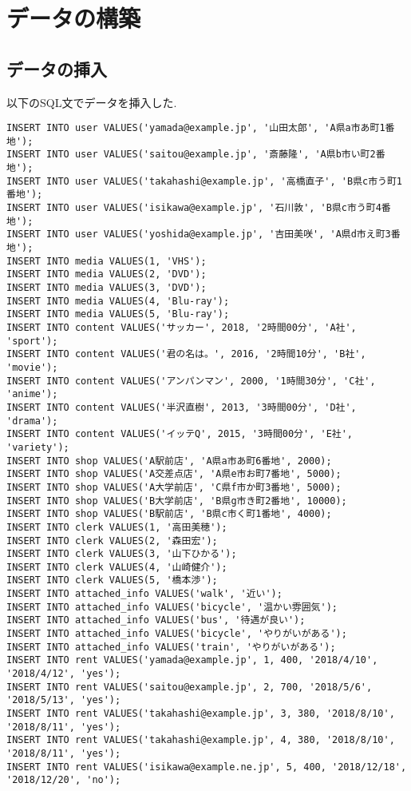 \documentclass{jarticle}
\begin{document}
\section{データの構築}
\subsection{データの挿入}
以下のSQL文でデータを挿入した.
\begin{verbatim}
INSERT INTO user VALUES('yamada@example.jp', '山田太郎', 'A県a市あ町1番地');
INSERT INTO user VALUES('saitou@example.jp', '斎藤隆', 'A県b市い町2番地');
INSERT INTO user VALUES('takahashi@example.jp', '高橋直子', 'B県c市う町1番地');
INSERT INTO user VALUES('isikawa@example.jp', '石川敦', 'B県c市う町4番地');
INSERT INTO user VALUES('yoshida@example.jp', '吉田美咲', 'A県d市え町3番地');
INSERT INTO media VALUES(1, 'VHS');
INSERT INTO media VALUES(2, 'DVD');
INSERT INTO media VALUES(3, 'DVD');
INSERT INTO media VALUES(4, 'Blu-ray');
INSERT INTO media VALUES(5, 'Blu-ray');
INSERT INTO content VALUES('サッカー', 2018, '2時間00分', 'A社', 'sport');
INSERT INTO content VALUES('君の名は。', 2016, '2時間10分', 'B社', 'movie');
INSERT INTO content VALUES('アンパンマン', 2000, '1時間30分', 'C社', 'anime');
INSERT INTO content VALUES('半沢直樹', 2013, '3時間00分', 'D社', 'drama');
INSERT INTO content VALUES('イッテQ', 2015, '3時間00分', 'E社', 'variety');
INSERT INTO shop VALUES('A駅前店', 'A県a市あ町6番地', 2000);
INSERT INTO shop VALUES('A交差点店', 'A県e市お町7番地', 5000);
INSERT INTO shop VALUES('A大学前店', 'C県f市か町3番地', 5000);
INSERT INTO shop VALUES('B大学前店', 'B県g市き町2番地', 10000);
INSERT INTO shop VALUES('B駅前店', 'B県c市く町1番地', 4000);
INSERT INTO clerk VALUES(1, '高田美穂');
INSERT INTO clerk VALUES(2, '森田宏');
INSERT INTO clerk VALUES(3, '山下ひかる');
INSERT INTO clerk VALUES(4, '山崎健介');
INSERT INTO clerk VALUES(5, '橋本渉');
INSERT INTO attached_info VALUES('walk', '近い');
INSERT INTO attached_info VALUES('bicycle', '温かい雰囲気');
INSERT INTO attached_info VALUES('bus', '待遇が良い');
INSERT INTO attached_info VALUES('bicycle', 'やりがいがある');
INSERT INTO attached_info VALUES('train', 'やりがいがある');
INSERT INTO rent VALUES('yamada@example.jp', 1, 400, '2018/4/10', '2018/4/12', 'yes');
INSERT INTO rent VALUES('saitou@example.jp', 2, 700, '2018/5/6', '2018/5/13', 'yes');
INSERT INTO rent VALUES('takahashi@example.jp', 3, 380, '2018/8/10', '2018/8/11', 'yes');
INSERT INTO rent VALUES('takahashi@example.jp', 4, 380, '2018/8/10', '2018/8/11', 'yes');
INSERT INTO rent VALUES('isikawa@example.ne.jp', 5, 400, '2018/12/18', '2018/12/20', 'no');

\end{verbatim}
\end{document}
